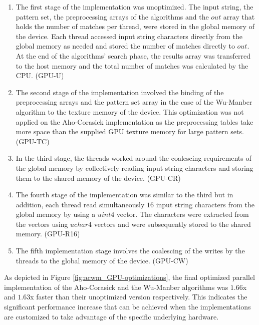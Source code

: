 \documentclass{ws-ijait}
\begin{document}
\begin{enumerate}
	
	\item The first stage of the implementation was unoptimized. The input string, the pattern set, the preprocessing arrays of the algorithms and the $out$ array that holds the number of matches per thread, were stored in the global memory of the device. Each thread accessed input string characters directly from the global memory as needed and stored the number of matches directly to $out$. At the end of the algorithms' search phase, the results array was transferred to the host memory and the total number of matches was calculated by the CPU. (GPU-U)
	
	\item The second stage of the implementation involved the binding of the preprocessing arrays and the pattern set array in the case of the Wu-Manber algorithm to the texture memory of the device. This optimization was not applied on the Aho-Corasick implementation as the preprocessing tables take more space than the supplied GPU texture memory for large pattern sets. (GPU-TC)
	
	\item In the third stage, the threads worked around the coalescing requirements of the global memory by collectively reading input string characters and storing them to the shared memory of the device. (GPU-CR)
	
	\item The fourth stage of the implementation was similar to the third but in addition, each thread read simultaneously $16$ input string characters from the global memory by using a $uint4$ vector. The characters were extracted from the vectors using $uchar4$ vectors and were subsequently stored to the shared memory. (GPU-R16)
	
	\item The fifth implementation stage involves the coalescing of the writes by the threads to the global memory of the device. (GPU-CW)
	
\end{enumerate}

As depicted in Figure \ref{fig:acwm_GPU-optimizations}, the final optimized parallel implementation of the Aho-Corasick and the Wu-Manber algorithms was $1.66$x and $1.63$x faster than their unoptimized version respectively. This indicates the significant performance increase that can be achieved when the implementations are customized to take advantage of the specific underlying hardware.
\end{document}
